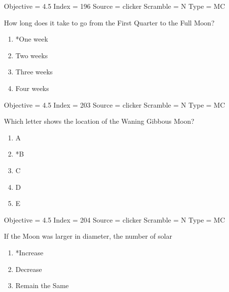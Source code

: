 \documentclass[11pt]{article}
\begin{document}
\begin{enumerate}
\begin{minipage}{\textwidth}
\begin{minipage}{\textwidth}
Objective = 4.5
Index = 196
Source = clicker
Scramble = N
Type = MC
\end{minipage}
\end{minipage}
\vskip 0.20in

\begin{minipage}{\textwidth}
\begin{minipage}{\textwidth}
\item How long does it take to go from the First Quarter to the Full Moon?
\begin{multicols}{3}
\begin{enumerate} 
\setlength{\itemsep}{1pt} 
\setlength{\parskip}{0pt} 
\setlength{\parsep}{0pt}
\setlength{\multicolsep}{1pt} 
\item *One week
\item Two weeks
\item Three weeks
\item Four weeks
\end{enumerate} 
\vfill 
\end{multicols}

Objective = 4.5
Index = 203
Source = clicker
Scramble = N
Type = MC
\end{minipage}
\end{minipage}
\vskip 0.20in

\begin{minipage}{\textwidth}
\begin{minipage}{\textwidth}
\item Which letter shows the location of the Waning Gibbous Moon?
\begin{multicols}{3}
\begin{enumerate} 
\setlength{\itemsep}{1pt} 
\setlength{\parskip}{0pt} 
\setlength{\parsep}{0pt}
\setlength{\multicolsep}{1pt} 
\item A
\item *B
\item C
\item D
\item E
\end{enumerate} 
\vfill 
\end{multicols}

Objective = 4.5
Index = 204
Source = clicker
Scramble = N
Type = MC
\end{minipage}
\end{minipage}
\vskip 0.20in

\begin{minipage}{\textwidth}
\begin{minipage}{\textwidth}
\item If the Moon was larger in diameter, the number of solar
\begin{multicols}{3}
\begin{enumerate} 
\setlength{\itemsep}{1pt} 
\setlength{\parskip}{0pt} 
\setlength{\parsep}{0pt}
\setlength{\multicolsep}{1pt} 
\item *Increase
\item Decrease
\item Remain the Same
\end{enumerate} 
\vfill 
\end{multicols}


\end{minipage}
\end{minipage}
\end{enumerate}
\end{document}
